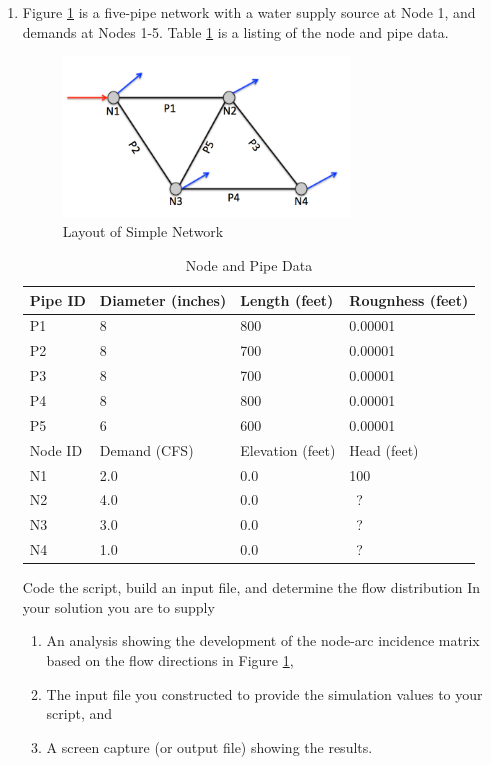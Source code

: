 \begin{enumerate}
\item Figure \ref{fig:NetworkLayout} is a five-pipe network with a water supply source at Node 1, and demands at Nodes 1-5.
Table \ref{tab:PipeData} is a listing of the node and pipe data.

\begin{figure}[h!] %
\centering
   \includegraphics[width=3in]{./8-PipeNetworkHydraulics/NetworkLayout.jpg}
   \caption{Layout of Simple Network}
   \label{fig:NetworkLayout} 
\end{figure}

\begin{table}[htbp]
   \centering
   \caption{Node and Pipe Data}
    \begin{tabular}{p{1in} p{1in} p{1in} p{1in} } %
    \hline
    \hline
Pipe ID & Diameter (inches) & Length (feet) & Rougnhess (feet) \\
\hline
P1 & 8 & 800 & 0.00001  \\
P2 & 8 & 700 & 0.00001  \\
P3 & 8 & 700 & 0.00001  \\
P4 & 8 & 800 & 0.00001  \\
P5 & 6 & 600 & 0.00001  \\
\hline
\hline
Node ID & Demand (CFS) & Elevation (feet) & Head (feet) \\
\hline
N1 & 2.0 & 0.0 & 100 \\
N2 & 4.0 & 0.0 & ~? \\
N3 & 3.0 & 0.0 & ~? \\
N4 & 1.0 & 0.0 & ~? \\
   \end{tabular}
   \label{tab:PipeData}
\end{table}

Code the script, build an input file, and determine the flow distribution
In your solution you are to supply
\begin{enumerate}
\item An analysis showing the development of the node-arc incidence matrix based on the flow directions in Figure \ref{fig:NetworkLayout},
\item The input file you constructed to provide the simulation values to your script, and
\item A screen capture (or output file) showing the results.
\end{enumerate}



\end{enumerate}
